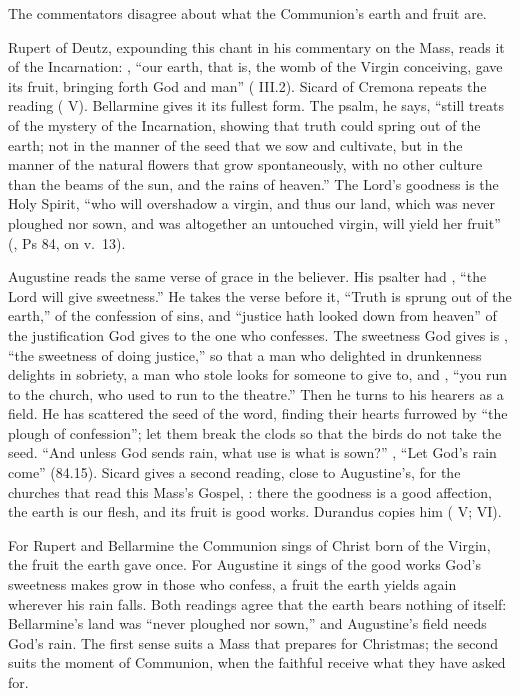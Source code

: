 The commentators disagree about what the Communion's earth and fruit are.

Rupert of Deutz, expounding this chant in his commentary on the Mass, reads
it of the Incarnation: , ``our earth, that
is, the womb of the Virgin conceiving, gave its fruit, bringing forth God and
man'' ( III.2). Sicard of Cremona repeats the
reading ( V). Bellarmine gives it its fullest
form. The psalm,
he says, ``still treats of the mystery of the Incarnation, showing that truth
could spring out of the earth; not in the manner of the seed that we sow and
cultivate, but in the manner of the natural flowers that grow spontaneously,
with no other culture than the beams of the sun, and the rains of heaven.''
The Lord's goodness is the Holy Spirit, ``who will overshadow a virgin, and
thus our land, which was never ploughed nor sown, and was altogether an
untouched virgin, will yield her fruit'' (, Ps 84, on v.~13).

Augustine reads the same verse of grace in the believer. His psalter had
, ``the Lord will give sweetness.'' He takes
the verse before it, ``Truth is sprung out of the earth,'' of the confession
of sins, and ``justice hath looked down from heaven'' of the justification
God gives to the one who confesses. The sweetness God gives is
, ``the sweetness of doing justice,'' so
that a man who delighted in drunkenness delights in sobriety, a man who stole
looks for someone to give to, and , ``you run to the church, who used to run to the
theatre.'' Then he turns to his hearers as a field. He has scattered the seed
of the word, finding their hearts furrowed by ``the plough of confession'';
let them break the clods so that the birds do not take the seed.  ``And unless God sends rain,
what use is what is sown?'' , ``Let God's rain come''
(84.15). Sicard gives a second reading, close to Augustine's, for the
churches that read this Mass's Gospel, : there the
goodness is a good affection, the earth is our flesh, and its fruit is good
works. Durandus copies him ( V;  VI).

For Rupert and Bellarmine the Communion sings of Christ born of the Virgin,
the fruit the earth gave once. For Augustine it sings of the good works God's
sweetness makes grow in those who confess, a fruit the earth yields again
wherever his rain falls. Both readings agree that the earth bears nothing of
itself: Bellarmine's land was ``never ploughed nor sown,'' and Augustine's
field needs God's rain. The first sense suits a Mass that prepares for
Christmas; the second suits the moment of Communion, when the faithful
receive what they have asked for.

